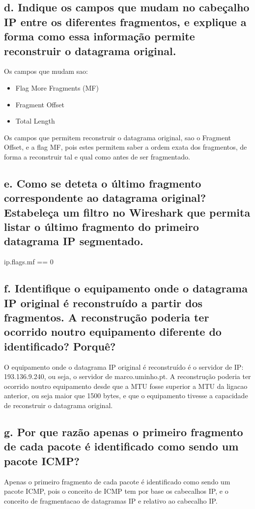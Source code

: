 \documentclass{article}
\begin{document}
\subsection*{d. Indique os campos que mudam no cabeçalho IP entre os diferentes
fragmentos, e explique a forma como essa informação permite
reconstruir o datagrama original.}

Os campos que mudam sao:
\begin{itemize}
    \item Flag More Fragments (MF)
    \item Fragment Offset
    \item Total Length
\end{itemize}
Os campos que permitem reconstruir o datagrama original, sao o Fragment Offset, e a flag MF, pois estes permitem saber a ordem exata dos fragmentos, de forma a reconstruir tal e qual como antes de ser fragmentado.

\subsection*{e. Como se deteta o último fragmento correspondente ao datagrama
original? Estabeleça um filtro no Wireshark que permita listar o último
fragmento do primeiro datagrama IP segmentado.}

ip.flags.mf == 0

\subsection*{f. Identifique o equipamento onde o datagrama IP original é reconstruído a
partir dos fragmentos. A reconstrução poderia ter ocorrido noutro
equipamento diferente do identificado? Porquê?}

O equipamento onde o datagrama IP original é reconstruído é o servidor de IP: 193.136.9.240, ou seja, o servidor de marco.uminho.pt. A reconstrução poderia ter ocorrido noutro equipamento desde que a MTU fosse superior a MTU da ligacao anterior, ou seja maior que 1500 bytes, e que o equipamento tivesse a capacidade de reconstruir o datagrama original.

\subsection*{g. Por que razão apenas o primeiro fragmento de cada pacote é identificado
como sendo um pacote ICMP?}

Apenas o primeiro fragmento de cada pacote é identificado como sendo um pacote ICMP, pois o conceito de ICMP tem por base os cabecalhos IP, e o conceito de fragmentacao de datagramas IP e relativo ao cabecalho IP.
\end{document}
